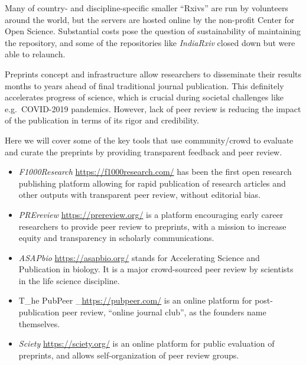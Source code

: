 \documentclass[
  letterpaper,
  DIV=11,
  numbers=noendperiod]{scrreport}
\providecommand{\tightlist}{%
  \setlength{\itemsep}{0pt}\setlength{\parskip}{0pt}}\usepackage{longtable,booktabs,array}
\begin{document}
Many of country- and discipline-specific smaller ``Rxivs'' are run by
volunteers around the world, but the servers are hosted online by the
non-profit Center for Open Science. Substantial costs pose the question
of sustainability of maintaining the repository, and some of the
repositories like \emph{IndiaRxiv} closed down but were able to
relaunch.

Preprints concept and infrastructure allow researchers to disseminate
their results months to years ahead of final traditional journal
publication. This definitely accelerates progress of science, which is
crucial during societal challenges like e.g.~COVID-2019 pandemics.
However, lack of peer review is reducing the impact of the publication
in terms of its rigor and credibility.

Here we will cover some of the key tools that use community/crowd to
evaluate and curate the preprints by providing transparent feedback and
peer review.

\begin{itemize}
\tightlist
\item
  \emph{F1000Research} \url{https://f1000research.com/} has been the
  first open research publishing platform allowing for rapid publication
  of research articles and other outputs with transparent peer review,
  without editorial bias.
\item
  \emph{PREreview} \url{https://prereview.org/} is a platform
  encouraging early career researchers to provide peer review to
  preprints, with a mission to increase equity and transparency in
  scholarly communications.
\item
  \emph{ASAPbio} \url{https://asapbio.org/} stands for Accelerating
  Science and Publication in biology. It is a major crowd-sourced peer
  review by scientists in the life science discipline.
\item
  T\_he PubPeer \_\url{https://pubpeer.com/} is an online platform for
  post-publication peer review, ``online journal club'', as the founders
  name themselves.
\item
  \emph{Sciety} \url{https://sciety.org/} is an online platform for
  public evaluation of preprints, and allows self-organization of peer
  review groups.
\end{itemize}
\end{document}

